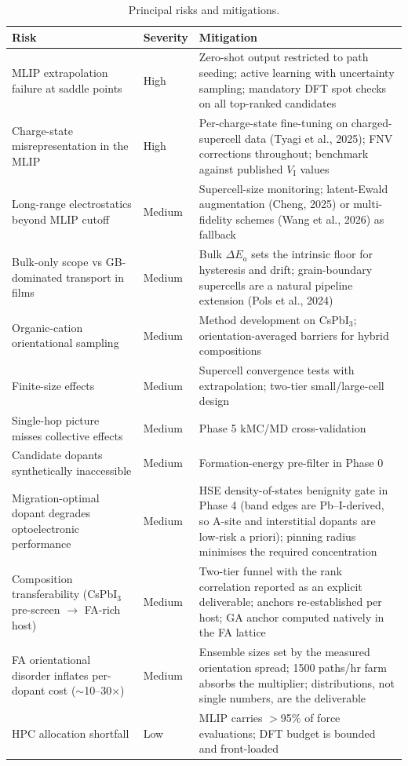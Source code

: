 \documentclass[11pt,a4paper]{article}
\begin{document}
\begin{table}[H]
\centering\small
\begin{tabular}{@{}p{4.6cm}p{1.5cm}p{8.2cm}@{}}
\toprule
\textbf{Risk} & \textbf{Severity} & \textbf{Mitigation} \\
\midrule
MLIP extrapolation failure at saddle points & High & Zero-shot output restricted to
path seeding; active learning with uncertainty sampling; mandatory DFT spot checks on
all top-ranked candidates \\
Charge-state misrepresentation in the MLIP & High & Per-charge-state fine-tuning on
charged-supercell data (Tyagi et al., 2025); FNV corrections throughout; benchmark
against published $V_{\mathrm{I}}$ values \\
Long-range electrostatics beyond MLIP cutoff & Medium & Supercell-size monitoring;
latent-Ewald augmentation (Cheng, 2025) or multi-fidelity schemes (Wang et al., 2026)
as fallback \\
Bulk-only scope vs GB-dominated transport in films & Medium & Bulk $\Delta E_a$ sets
the intrinsic floor for hysteresis and drift; grain-boundary supercells are a natural
pipeline extension (Pols et al., 2024) \\
Organic-cation orientational sampling & Medium & Method development on CsPbI$_3$;
orientation-averaged barriers for hybrid compositions \\
Finite-size effects & Medium & Supercell convergence tests with extrapolation;
two-tier small/large-cell design \\
Single-hop picture misses collective effects & Medium & Phase 5 kMC/MD
cross-validation \\
Candidate dopants synthetically inaccessible & Medium & Formation-energy pre-filter in
Phase 0 \\
Migration-optimal dopant degrades optoelectronic performance & Medium & HSE
density-of-states benignity gate in Phase 4 (band edges are Pb--I-derived, so A-site
and interstitial dopants are low-risk a priori); pinning radius minimises the required
concentration \\
Composition transferability (CsPbI$_3$ pre-screen $\to$ FA-rich host) & Medium &
Two-tier funnel with the rank correlation reported as an explicit deliverable;
anchors re-established per host; GA anchor computed natively in the FA lattice \\
FA orientational disorder inflates per-dopant cost ($\sim$10--30$\times$) & Medium &
Ensemble sizes set by the measured orientation spread; 1500 paths/hr farm absorbs
the multiplier; distributions, not single numbers, are the deliverable \\
HPC allocation shortfall & Low & MLIP carries $>$95\% of force evaluations; DFT budget
is bounded and front-loaded \\
\bottomrule
\end{tabular}
\caption{Principal risks and mitigations.}
\end{table}
\end{document}
